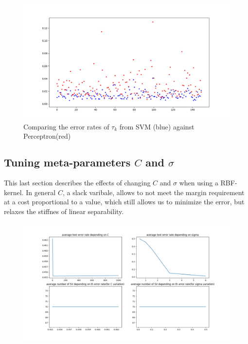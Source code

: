 \begin{figure}[!h]
\begin{center}
\centering
\includegraphics[width=1\textwidth]{figures/perc_svn_comparison.png}
\end{center}
\caption{\label{fig:error_SVM_perc} Comparing the error rates of $\tau_k$ from SVM (blue) against Perceptron(red) }
\end{figure}



\subsection{Tuning meta-parameters $C$ and $\sigma$}

This last section describes the effects of changing $C$ and $\sigma$ when using a RBF-kernel. In general $C$, a slack varibale, allows to not meet the margin requirement at a cost proportional to a value, which still allows us to minimize the error, but relaxes the stiffnes of linear separability.


\begin{figure}[!h]
\begin{center}
\centering
\includegraphics[width=1\textwidth]{figures/avg_test_error.png}
\end{center}
\caption{\label{fig:error_avg_erros} }
\end{figure}





